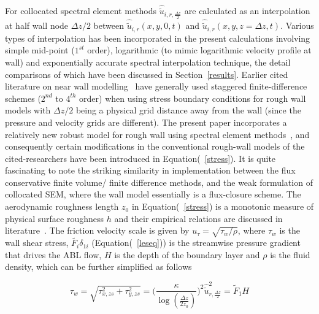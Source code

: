 \documentclass[times]{fldauth}
\begin{document}
For collocated spectral element methods $\widehat{\widetilde{u}}_{i,r,\frac{\Delta z}{2}}$ are calculated as an interpolation at half wall node $\Delta z/2$ between $\widehat{\widetilde{u}}_{i,r}(x,y,0,t)$ and $\widehat{\widetilde{u}}_{i,r}(x,y,z=\Delta z,t)$. Various types of interpolation has been incorporated in the present calculations involving simple mid-point ($1^{st}$ order), logarithmic (to mimic logarithmic velocity profile at wall) and exponentially accurate spectral interpolation technique, the detail comparisons of which have been discussed in Section~\ref{results}. Earlier cited literature on near wall modelling~\cite{deardoff,schumann,grot,moeng1,pio_wall,bal2,porte1fun,meyers2} have generally used staggered finite-difference schemes ($2^{nd}$ to $4^{th }$ order) when using stress boundary conditions for rough wall models with $\Delta z/2$ being a physical grid distance away from the wall (since the pressure and velocity grids are different). The present paper incorporates a relatively new robust model for rough wall using spectral element methods~\cite{tan}, and consequently certain modifications in the conventional rough-wall models of the cited-researchers have been introduced in Equation(~\ref{stress}). It is quite fascinating to note the striking  similarity in implementation between the flux conservative finite volume/ finite difference methods, and the weak formulation of collocated SEM, where the wall model essentially is a flux-closure scheme.
The aerodynamic roughness length $z_0$ in Equation(~\ref{stress}) is a monotonic measure of physical surface roughness $h$ and their empirical relations are discussed in literature~\cite{bhag,taft,cast}. The friction velocity scale is given by $u_{\tau} = \sqrt{{\tau_{w}}/{\rho}}$, where $\tau_{w}$ is the wall shear stress, $\widetilde{F_{i}}\delta_{1i}$ (Equation(~\ref{leseq})) is the streamwise pressure gradient that drives the ABL flow, $H$ is the depth of the boundary layer and $\rho$ is the fluid density, which can be further simplified as follows

\begin{equation}
\tau_{w} = \sqrt{\tau_{x,zs}^{2} + \tau_{y,zs}^2} = \bigg(\frac{\kappa}{\log (\frac{\Delta z}{2z_0})}\bigg)^{2}\widehat{\widetilde{u}}_{r,\frac{\Delta z}{2}}^{2} = \widetilde{F}_{1}H \label{stress2}
\end{equation}
\end{document}
